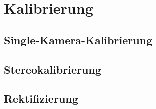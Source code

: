 \chapter{Kalibrierung}
\section{Single-Kamera-Kalibrierung}
\section{Stereokalibrierung}
\section{Rektifizierung}
